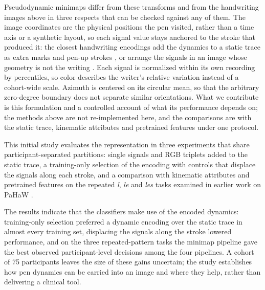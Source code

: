 Pseudodynamic minimaps differ from these transforms and from the handwriting images above in three respects that can be checked against any of them. The image coordinates are the physical positions the pen visited, rather than a time axis or a synthetic layout, so each signal value stays anchored to the stroke that produced it: the closest handwriting encodings add the dynamics to a static trace as extra marks and pen-up strokes \cite{Diaz2019}, or arrange the signals in an image whose geometry is not the writing \cite{Cilia2021SyntheticImages}. Each signal is normalized within its own recording by percentiles, so color describes the writer's relative variation instead of a cohort-wide scale. Azimuth is centered on its circular mean, so that the arbitrary zero-degree boundary does not separate similar orientations. What we contribute is this formulation and a controlled account of what its performance depends on; the methods above are not re-implemented here, and the comparisons are with the static trace, kinematic attributes and pretrained features under one protocol.

This initial study evaluates the representation in three experiments that share participant-separated partitions: single signals and RGB triplets added to the static trace, a training-only selection of the encoding with controls that displace the signals along each stroke, and a comparison with kinematic attributes and pretrained features on the repeated \textit{l}, \textit{le} and \textit{les} tasks examined in earlier work on PaHaW \cite{Casademunt2023}.

The results indicate that the classifiers make use of the encoded dynamics: training-only selection preferred a dynamic encoding over the static trace in almost every training set, displacing the signals along the stroke lowered performance, and on the three repeated-pattern tasks the minimap pipeline gave the best observed participant-level decisions among the four pipelines. A cohort of 75 participants leaves the size of these gains uncertain; the study establishes how pen dynamics can be carried into an image and where they help, rather than delivering a clinical tool.

